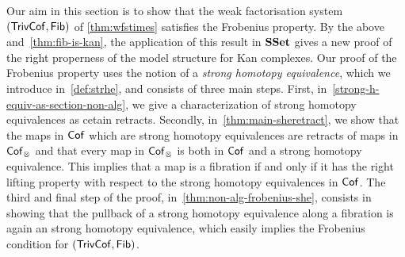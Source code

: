 \documentclass[reqno,10pt,a4paper,oneside,draft]{amsart}
\begin{document}
Our aim in this section is to show that
the weak factorisation system $(\mathsf{TrivCof}, \mathsf{Fib})$ of  \cref{thm:wfstimes} satisfies the Frobenius property. By the above and~\cref{thm:fib-is-kan}, the application of this result in $\mathbf{SSet}$ gives a new proof of the right properness of the model structure for Kan complexes. 
Our proof of the Frobenius property uses the notion of a \emph{strong homotopy equivalence}, which we introduce in~\cref{def:strhe}, and consists of three main steps. First, in~\cref{strong-h-equiv-as-section-non-alg}, we give a characterization of strong homotopy equivalences as cetain retracts. Secondly, in~\cref{thm:main-sheretract}, we show that the maps in $\mathsf{Cof}$ which are strong homotopy
equivalences are retracts of maps in $\mathsf{Cof}_\otimes$ and that every map in $\mathsf{Cof}_\otimes$ is both in $\mathsf{Cof}$ and a strong homotopy equivalence. This implies that a map is
a fibration if and only if it has the right lifting property with respect to the strong homotopy equivalences in $\mathsf{Cof}$. The third and final step of the proof, in~\cref{thm:non-alg-frobenius-she},  consists in showing that the pullback
of a strong homotopy equivalence along a fibration is again an strong homotopy equivalence, which easily implies 
the Frobenius condition for $(\mathsf{TrivCof}, \mathsf{Fib})$.
\end{document}
